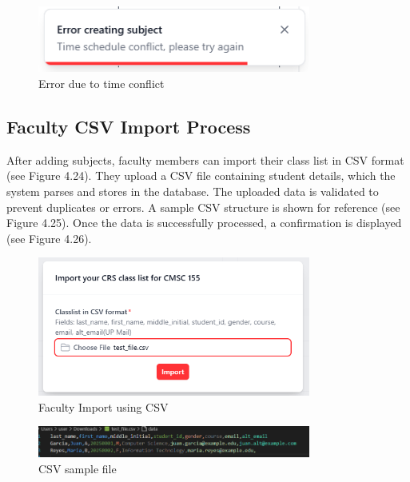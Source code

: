 \begin{figure}[h] %
	\centering
	\includegraphics[width=0.8\textwidth]{figures/chapter4/subject_add_error.png} %
	\caption{Error due to time conflict}
	\label{fig:subject_add_error}
\end{figure}
\subsection{Faculty CSV Import Process}
After adding subjects, faculty members can import their class list in CSV format (see Figure 4.24). They upload a CSV file containing student details, which the system parses and stores in the database. The uploaded data is validated to prevent duplicates or errors. A sample CSV structure is shown for reference (see Figure 4.25). Once the data is successfully processed, a confirmation is displayed (see Figure 4.26).
\begin{figure}[h] %
	\centering
	\includegraphics[width=0.8\textwidth]{figures/chapter4/faculty_import.png} %
	\caption{Faculty Import using CSV}
	\label{fig:faculty_import}
\end{figure}
\begin{figure}[h] %
	\centering
	\includegraphics[width=0.8\textwidth]{figures/chapter4/faculty_import_csv.png} %
	\caption{CSV sample file}
	\label{fig:faculty_import_csv}
\end{figure}

